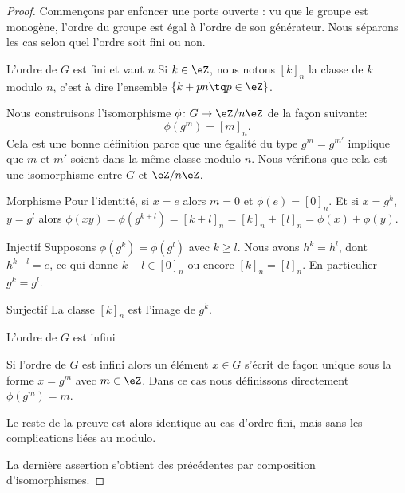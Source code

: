 \begin{proof}

    Commençons par enfoncer une porte ouverte : vu que le groupe est monogène, l'ordre du groupe est égal à l'ordre de son générateur. Nous séparons les cas selon quel l'ordre soit fini ou non. 

    \begin{subproof}
        \item[L'ordre de \( G\) est fini et vaut \( n\)]
            Si \( k\in\eZ\), nous notons \( [k]_n\) la classe de \( k\) modulo \( n\), c'est à dire l'ensemble \( \{ k+pn\tq p\in \eZ \}\).

            Nous construisons l'isomorphisme \( \phi\colon G\to \eZ/n\eZ\) de la façon suivante: 
            \begin{equation}
                \phi(g^m)=[m]_n.
            \end{equation}
            Cela est une bonne définition parce que une égalité du type \( g^m=g^{m'}\) implique que \( m\) et \( m'\) soient dans la même classe modulo \( n\). Nous vérifions que cela est une isomorphisme entre \( G\) et \( \eZ/n\eZ\).

            \begin{subproof}
            \item[Morphisme]
                Pour l'identité, si \( x=e\) alors \( m=0\) et \( \phi(e)=[0]_n\). Et si \( x=g^k\), \( y=g^l\) alors \( \phi(xy)=\phi(g^{k+l})=[k+l]_n=[k]_n+[l]_n=\phi(x)+\phi(y) \).
            \item[Injectif]
                Supposons \( \phi(g^k)=\phi(g^l)\) avec \( k\geq l\). Nous avons \( h^k=h^l\), dont \( h^{k-l}=e\), ce qui donne \( k-l\in [0]_n\) ou encore \( [k]_n=[l]_n\). En particulier \( g^k=g^l\).
            \item[Surjectif]
                La classe \( [k]_n\) est l'image de \( g^k\).
            \end{subproof}

        \item[L'ordre de \( G\) est infini]

                Si l'ordre de \( G\) est infini alors un élément \( x\in G\) s'écrit de façon unique sous la forme \( x=g^m\) avec \( m\in \eZ\). Dans ce cas nous définissons directement \( \phi(g^m)=m\).

                Le reste de la preuve est alors identique au cas d'ordre fini, mais sans les complications liées au modulo.

    \end{subproof}

    La dernière assertion s'obtient des précédentes par composition d'isomorphismes.

\end{proof}

